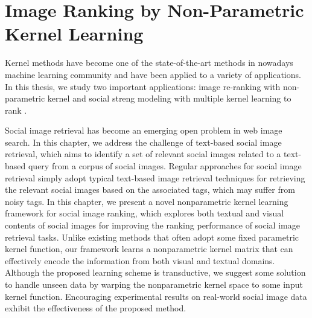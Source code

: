 \def\T{{\cal T}}
\def\X{{\cal X}}
\def\Q{{\cal Q}}
\def\R{{\mathbb R}}
\def\U{{\mathcal U}}
\def\M{{\mathbf M}}
\def\N{{\mathbb N}}
\def\R{{\mathbb R}}
\def\E{{\mathbb E}}
\def\U{{\mathcal U}}
\def\G{{\mathcal G}}
\def\Z{{\mathcal Z}}
\def\X{{\mathcal X}}
\def\C{{\mathcal C}}
\def\I{{\mathbf I}}
\def\P{{P}}
\def\K{{\mathbf K}}
\def\Y{{\mathbf Y}}
\def\z{{\mathbf z}}
\def\t{{\mathbf t}}
\def\u{{u}}
\def\w{{\mathbf w}}
\def\g{{\mathbf g}}
\def\bp{{\bm\phi}}
\def\L{{\cal L}}

\chapter{Image Ranking by Non-Parametric Kernel Learning}
\label{chp:application}

Kernel methods have become one of the state-of-the-art methods in nowadays machine learning community and have been applied to a variety of applications. In this thesis, we study two important applications: image re-ranking with non-parametric kernel \cite{civr/ZhuangH10} and social streng modeling with multiple kernel learning to rank \cite{mm/ZhuangMHHL11}.


Social image retrieval has become an emerging open problem in web
image search. In this chapter, we address the challenge of text-based social
image retrieval, which aims to identify a set of relevant social images
related to a text-based query from a corpus of social images. Regular
approaches for social image retrieval simply adopt typical text-based
image retrieval techniques for retrieving the relevant social images based
on the associated tags, which may suffer from noisy tags. In this chapter, we
present a novel nonparametric kernel learning framework for social image
ranking, which explores both textual and visual contents of social images
for improving the ranking performance of social image retrieval tasks.
Unlike existing methods that often adopt some fixed parametric kernel
function, our framework learns a nonparametric kernel matrix that can
effectively encode the information from both visual and textual domains.
Although the proposed learning scheme is transductive, we suggest some
solution to handle unseen data by warping the nonparametric kernel space
to some input kernel function. Encouraging experimental results on
real-world social image data exhibit the effectiveness of the proposed
method.

